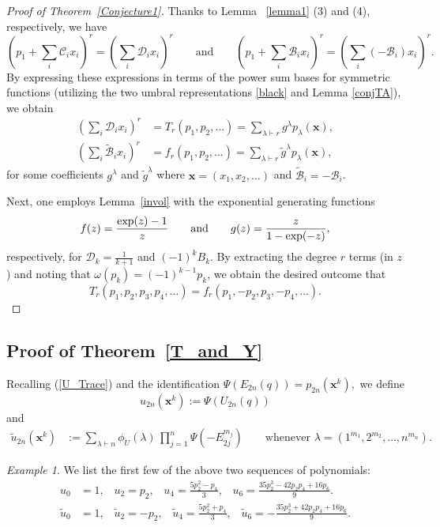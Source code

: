 \documentclass[11pt]{amsart}
\theoremstyle{definition}
\theoremstyle{remark}
\newtheorem*{example}{Example}
\numberwithin{equation}{section}
\begin{document}
\begin{proof}[Proof of Theorem~\ref{Conjecture1}]
Thanks to Lemma ~\ref{lemma1} (3) and (4), respectively, we have
$$\left(p_1+\sum_i \mathcal{C}_ix_i\right)^r=\left(\sum_i\mathcal{D}_ix_i\right)^r \qquad \text{and} \qquad
\left(p_1+\sum_i \mathcal{B}_ix_i\right)^r=\left(\sum_i(-\mathcal{B}_i)x_i\right)^r.
$$ 
By expressing these expressions in terms of the power sum bases for symmetric functions (utilizing the two umbral representations \eqref{black} and Lemma \ref{conjTA}), we obtain
\begin{align*} 
\left (\sum_i\mathcal{D}_ix_i\right)^r & = T_r(p_1,p_2,\dots) = \sum_{\lambda\vdash r} g^{\lambda} p_{\lambda}(\pmb{x}), \\
\left (\sum_i\widetilde{\mathcal{B}}_ix_i\right )^r & = f_r(p_1,p_2,\dots) = \sum_{\lambda\vdash r} \widetilde{g}^{\lambda} p_{\lambda}(\pmb{x}),
\end{align*}
for some coefficients $g^{\lambda}$ and $\widetilde{g}^{\lambda}$ where $\pmb{x}=(x_1,x_2,\dots)$ and $\widetilde{\mathcal{B}}_i=-\mathcal{B}_i$.


Next, one employs Lemma~\ref{invol} with the exponential generating functions 
$$f(z)=\frac{\exp(z)-1}z \qquad {\text {\rm and}}\qquad g(z)=\frac{z}{1-\exp(-z)},
$$
respectively, for $\mathcal{D}_k=\frac1{k+1}$ and $(-1)^kB_k$. By extracting the degree $r$ terms (in $z$) and noting that $\omega(p_k)=(-1)^{k-1}p_k$, we obtain the desired outcome that
$$T_r(p_1,p_2,p_3,p_4,\dots)=f_r(p_1,-p_2,p_3,-p_4,\dots).$$
\end{proof}

\subsection{Proof of Theorem~\ref{T_and_Y}}


Recalling (\ref{U_Trace}) and the identification $\Psi(E_{2n}(q))=p_{2n}(\pmb{x}^k),$ we define
$$u_{2n}(\pmb{x}^k):=\Psi(U_{2n}(q))
$$
and
\begin{align} \label{u_tilde}
\widetilde{u}_{2n}(\pmb{x}^k)
&:= \sum_{\lambda\vdash n} \phi_U(\lambda)\, \prod_{j=1}^n\Psi(-E_{2j}^{m_j}) \qquad
\text{whenever $\lambda=(1^{m_1},2^{m_2},\dots,n^{m_n})$}.
\end{align}

\begin{example} We list the first few of the above two sequences of polynomials:
\begin{align*} u_0&=1, \,\,\, \,\,  u_2=p_2, \,\,\, \,\, u_4=\frac{5p_2^2-p_4}3, \,\,\, \,\,  u_6=\frac{35p_2^3-42p_2p_4+16p_6}9. \\
\widetilde{u}_0&=1, \,\,\, \,\,  \widetilde{u}_2=- p_2, \,\,\, \,\,  \widetilde{u}_4=\frac{5p_2^2+p_4}3, \,\,\, \,\,  \widetilde{u}_6=-\frac{35p_2^3+42p_2p_4+16p_6}9. \\
\end{align*}
\end{example}
\end{document}
